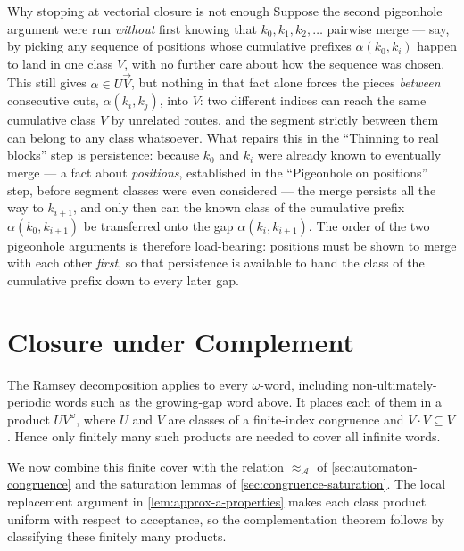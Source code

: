 \begin{counterpoint}{Why stopping at vectorial closure is not enough}
Suppose the second pigeonhole argument were run \emph{without} first
knowing that $k_0,k_1,k_2,\ldots$ pairwise merge --- say, by picking
any sequence of positions whose cumulative prefixes
$\alpha(k_0,k_i)$ happen to land in one class $V$, with no further
care about how the sequence was chosen.  This still gives
$\alpha\in U\overrightarrow V$, but nothing in that fact alone forces
the pieces \emph{between} consecutive cuts, $\alpha(k_i,k_j)$, into
$V$: two different indices can reach the same cumulative class $V$ by
unrelated routes, and the segment strictly between them can belong to
any class whatsoever.  What repairs this in the ``Thinning to real
blocks'' step is persistence: because $k_0$ and $k_i$ were already
known to eventually merge --- a fact about \emph{positions},
established in the ``Pigeonhole on positions'' step, before segment
classes were even considered --- the merge persists all the way to
$k_{i+1}$, and only then can the known class of the cumulative prefix
$\alpha(k_0,k_{i+1})$ be transferred onto the gap
$\alpha(k_i,k_{i+1})$.  The order of the two pigeonhole arguments is
therefore load-bearing: positions must be shown to merge with each
other \emph{first}, so that persistence is available to hand the class
of the cumulative prefix down to every later gap.
\end{counterpoint}

\section{Closure under Complement}
\label{sec:omega-complement-theorem}

The Ramsey decomposition applies to every $\omega$-word, including
non-ultimately-periodic words such as the growing-gap word above.  It
places each of them in a product $UV^\omega$, where $U$ and $V$ are
classes of a finite-index congruence and $V\cdot V\subseteq V$.  Hence
only finitely many such products are needed to cover all infinite words.

We now combine this finite cover with the relation
$\approx_{\mathcal A}$ of \cref{sec:automaton-congruence} and the
saturation lemmas of \cref{sec:congruence-saturation}.  The local
replacement argument in \cref{lem:approx-a-properties} makes each class
product uniform with respect to acceptance, so the complementation
theorem follows by classifying these finitely many products.

